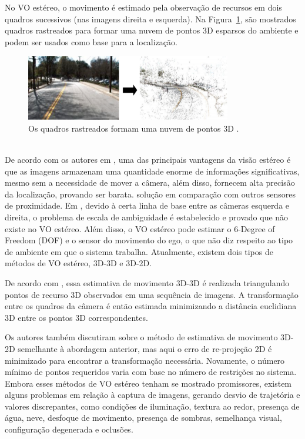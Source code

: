 No VO estéreo, o movimento é estimado pela observação de recursos em dois quadros sucessivos (nas imagens direita e esquerda). Na Figura~\ref{fig:Figures/Clound3DPoints}, são mostrados quadros rastreados para formar uma nuvem de pontos 3D esparsos do ambiente e podem ser usados como base para a localização.
\ \\
\begin{figure}[!htb]
	\centering	
	\includegraphics[width=0.8\textwidth]{Figures/Clound3DPoints.png}
	\caption{Os quadros rastreados formam uma nuvem de pontos 3D \cite{stivanello2008correspondencia}.}
	\label{fig:Figures/Clound3DPoints}
\end{figure}
\ \\
De acordo com os autores em \cite{stivanello2008correspondencia}, uma das principais vantagens da visão estéreo é que as imagens armazenam uma quantidade enorme de informações significativas, mesmo sem a necessidade de mover a câmera, além disso, fornecem alta precisão da localização, provando ser barata. solução em comparação com outros sensores de proximidade. Em \cite{zhou2017robust}, devido à certa linha de base entre as câmeras esquerda e direita, o problema de escala de ambiguidade é estabelecido e provado que não existe no VO estéreo. Além disso, o VO estéreo pode estimar o 6-Degree of Freedom (DOF) e o sensor do movimento do ego, o que não diz respeito ao tipo de ambiente em que o sistema trabalha. Atualmente, existem dois tipos de métodos de VO estéreo, 3D-3D e 3D-2D.

De acordo com \cite{yousif2015overview}, essa estimativa de movimento 3D-3D é realizada triangulando pontos de recurso 3D observados em uma sequência de imagens. A transformação entre os quadros da câmera é então estimada minimizando a distância euclidiana 3D entre os pontos 3D correspondentes.

Os autores também discutiram sobre o método de estimativa de movimento 3D-2D semelhante à abordagem anterior, mas aqui o erro de re-projeção 2D é minimizado para encontrar a transformação necessária. Novamente, o número mínimo de pontos requeridos varia com base no número de restrições no sistema.
Embora esses métodos de VO estéreo tenham se mostrado promissores, existem alguns problemas em relação à captura de imagens, gerando desvio de trajetória e valores discrepantes, como condições de iluminação, textura ao redor, presença de água, neve, desfoque de movimento, presença de sombras, semelhança visual, configuração degenerada e oclusões.

